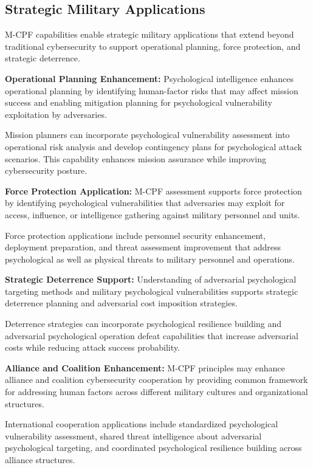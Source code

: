 \documentclass[10pt, twocolumn]{article}
\begin{document}
\subsection{Strategic Military Applications}

M-CPF capabilities enable strategic military applications that extend beyond traditional cybersecurity to support operational planning, force protection, and strategic deterrence.

\textbf{Operational Planning Enhancement:} Psychological intelligence enhances operational planning by identifying human-factor risks that may affect mission success and enabling mitigation planning for psychological vulnerability exploitation by adversaries.

Mission planners can incorporate psychological vulnerability assessment into operational risk analysis and develop contingency plans for psychological attack scenarios. This capability enhances mission assurance while improving cybersecurity posture.

\textbf{Force Protection Application:} M-CPF assessment supports force protection by identifying psychological vulnerabilities that adversaries may exploit for access, influence, or intelligence gathering against military personnel and units.

Force protection applications include personnel security enhancement, deployment preparation, and threat assessment improvement that address psychological as well as physical threats to military personnel and operations.

\textbf{Strategic Deterrence Support:} Understanding of adversarial psychological targeting methods and military psychological vulnerabilities supports strategic deterrence planning and adversarial cost imposition strategies.

Deterrence strategies can incorporate psychological resilience building and adversarial psychological operation defeat capabilities that increase adversarial costs while reducing attack success probability.

\textbf{Alliance and Coalition Enhancement:} M-CPF principles may enhance alliance and coalition cybersecurity cooperation by providing common framework for addressing human factors across different military cultures and organizational structures.

International cooperation applications include standardized psychological vulnerability assessment, shared threat intelligence about adversarial psychological targeting, and coordinated psychological resilience building across alliance structures.
\end{document}
